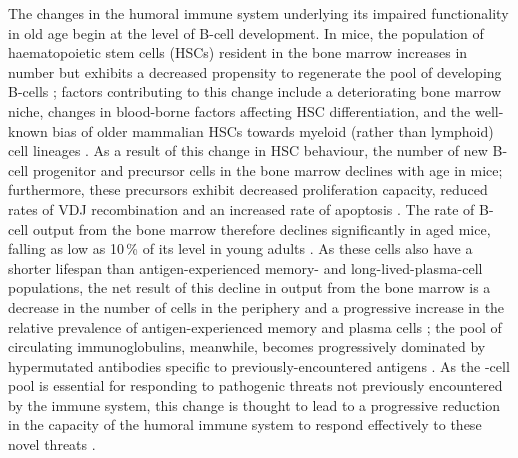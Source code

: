 The changes in the humoral immune system underlying its impaired functionality in old age begin at the level of B-cell development. In mice, the population of haematopoietic stem cells (HSCs) resident in the bone marrow increases in number but exhibits a decreased propensity to regenerate the pool of developing B-cells \parencite{ademokun2010ageing,kogut2012bcells}; factors contributing to this change include a deteriorating bone marrow niche, changes in blood-borne factors affecting HSC differentiation, and the well-known bias of older mammalian HSCs towards myeloid (rather than lymphoid) cell lineages \parencite{kogut2012bcells,dunnwalters2010bcellageing}. As a result of this change in HSC behaviour, the number of new B-cell progenitor and precursor cells in the bone marrow declines with age in mice; furthermore, these precursors exhibit decreased proliferation capacity, reduced rates of VDJ recombination and an increased rate of apoptosis \parencite{montecino2013immunosenescence,kogut2012bcells,labrie2004bone}. The rate of B-cell output from the bone marrow therefore declines significantly in aged mice, falling as low as 10\,\% of its level in young adults \parencite{kogut2012bcells}. As these \naive cells also have a shorter lifespan than antigen-experienced memory- and long-lived-plasma-cell populations, the net result of this decline in output from the bone marrow is a decrease in the number of \naive cells in the periphery and a progressive increase in the relative prevalence of antigen-experienced memory and plasma cells \parencite{mehr2011reversing,kogut2012bcells}; the pool of circulating immunoglobulins, meanwhile, becomes progressively dominated by hypermutated antibodies specific to previously-encountered antigens \parencite{kogut2012bcells}. As the \naive{}-cell pool is essential for responding to pathogenic threats not previously encountered by the immune system, this change is thought to lead to a progressive reduction in the capacity of the humoral immune system to respond effectively to these novel threats \parencite{kogut2012bcells}.

